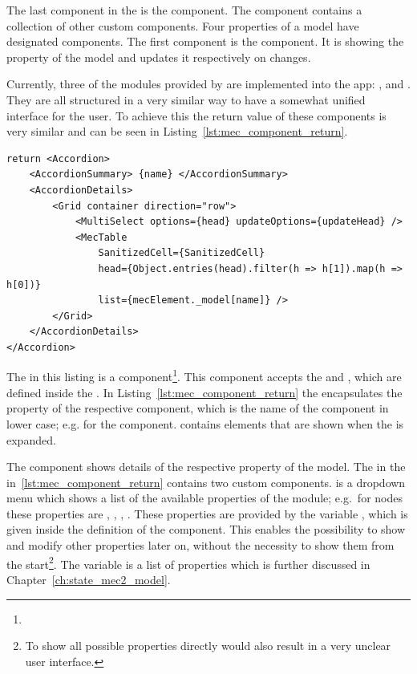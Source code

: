 The last component in the  is the  component.
The  component contains a collection of other custom components.
Four properties of a  model have designated components.
The first component is the  component.
It is showing the  property of the  model and updates it respectively on changes.

Currently, three of the modules provided by  are implemented into the app:
,  and .
They are all structured in a very similar way to have a somewhat unified interface for the user.
To achieve this the return value of these components is very similar and can be seen in Listing~\ref{lst:mec_component_return}.

\begin{lstlisting}[label={lst:mec_component_return}, caption={Return value of a custom \name{mec2} component.}]
return <Accordion>
    <AccordionSummary> {name} </AccordionSummary>
    <AccordionDetails>
        <Grid container direction="row">
            <MultiSelect options={head} updateOptions={updateHead} />
            <MecTable
                SanitizedCell={SanitizedCell}
                head={Object.entries(head).filter(h => h[1]).map(h => h[0])}
                list={mecElement._model[name]} />
        </Grid>
    </AccordionDetails>
</Accordion>
\end{lstlisting}

The  in this listing is a  component\footnote{}.
This component accepts the  and , which are defined inside the .
In Listing~\ref{lst:mec_component_return} the  encapsulates the  property of the respective component, which is the name of the component in lower case; e.g.  for the  component.
 contains elements that are shown when the  is expanded.

The  component shows details of the respective property of the  model.
The  in the  in~\ref{lst:mec_component_return} contains two custom components.
 is a dropdown menu which shows a list of the available properties of the module; e.g.\ for nodes these properties are , , , .
These properties are provided by the variable , which is given inside the definition of the component.
This enables the possibility to show and modify other properties later on, without the necessity to show them from the start\footnote{To show all possible properties directly would also result in a very unclear user interface.}.
The  variable is a list of properties which is further discussed in Chapter~\ref{ch:state_mec2_model}.

